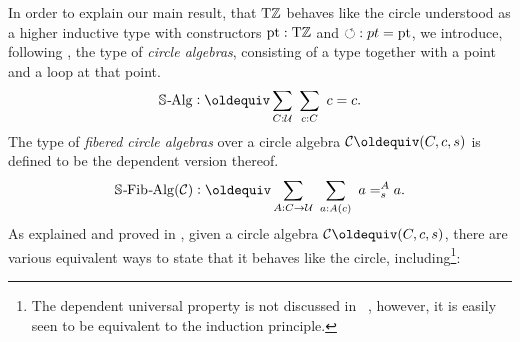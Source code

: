 \documentclass[a4paper,12pt]{amsart}
\begin{document}
In order to explain our main result,
that ${\mathrm{T}\mathbb{Z}}$ behaves like the circle understood as a higher inductive type
with constructors ${\mathord{\mathrm{pt}}} : {\mathrm{T}\mathbb{Z}}$ and ${\circlearrowleft} : pt = {\mathord{\mathrm{pt}}}$,
we introduce, following \cite{sojakova:hits-hias}, the type of \emph{circle algebras},
consisting of a type together with a point and a loop at that point.
\[
  \CircleAlg \defeq \sum_{C:\UU}~\sum_{c:C}~ c = c.
\]
The type of \emph{fibered circle algebras} over a circle algebra
$\mathcal C \jdeq (C,c,s)$ is defined to be the dependent version thereof.
\[
  \CircleFibAlg(\mathcal C) \defeq
  \sum_{A : C \to \UU}~\sum_{a:A(c)}~ a=^A_s a.
\]
As explained and proved in \cite[Thm.~50]{sojakova:hits-hias},
given a circle algebra $\mathcal C \jdeq (C,c,s)$,
there are various equivalent ways to state that it behaves like the circle,
including\footnote{%
  The dependent universal property is not discussed in~%
  \cite{sojakova:hits-hias}, however, it is easily seen
  to be equivalent to the induction principle.}:
\end{document}
